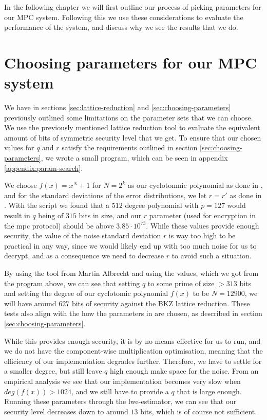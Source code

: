 \documentclass[../main.tex]{subfiles}
\begin{document}
In the following chapter we will first outline our process of picking parameters for our MPC system. Following this we use these considerations to evaluate the performance of the system, and discuss why we see the results that we do.

\section{Choosing parameters for our MPC system}
We have in sections \ref{sec:lattice-reduction} and \ref{sec:choosing-parameters} previously outlined some limitations on the parameter sets that we can choose. We use the previously mentioned lattice reduction tool to evaluate the equivalent amount of bits of symmetric security level that we get. To ensure that our chosen values for $q$ and $r$ satisfy the requirements outlined in section \ref{sec:choosing-parameters}, we wrote a small program, which can be seen in appendix \ref{appendix:param-search}.

We choose $f(x) = x^N + 1$ for $N = 2^k$ as our cyclotonmic polynomial as done in \cite{brakerski2011fully}, and for the standard deviations of the error distributions, we let $r = r'$ as done in \cite{damgaard2012multiparty}.
With the script we found that a $512$ degree polynomial with $p = 127$ would result in $q$ being of $315$ bits in size, and our $r$ parameter (used for encryption in the mpc protocol) should be above $3.85 \cdot 10^{73}$.
While these values provide enough security, the value of the noise standard deviation $r$ is way too high to be
practical in any way, since we would likely end up with too much noise for us to decrypt, and as a consequence we need to decrease $r$ to avoid such a situation.

By using the tool from Martin Albrecht \cite{cryptoeprint:2015:046}
and using the values, which we got from the program above, we can see that setting $q$ to some prime
of size $> 313$ bits and setting the degree of our cyclotomic polynomial $f(x)$ to be $N = 12900$, we will have around $627$ bits
of security against the BKZ lattice reduction.
These tests also align with the how the parameters in \cite{damgaard2012multiparty} are chosen, as described in section \ref{sec:choosing-parameters}.

While this provides enough security, it is by no means effective for us to run, and we do not have the component-wise multiplication optimisation, meaning that the efficiency of our implementation degrades further.
Therefore, we have to settle for a smaller degree, but still leave $q$ high enough make space for the noise.
From an empirical analysis we see that our implementation becomes very slow when $deg(f(x)) > 1024$, and we still have to provide a $q$ that is large enough.
Running these parameters through the lwe-estimator, we can see that our security level decreases
down to around $13$ bits, which is of course not sufficient.
\end{document}
